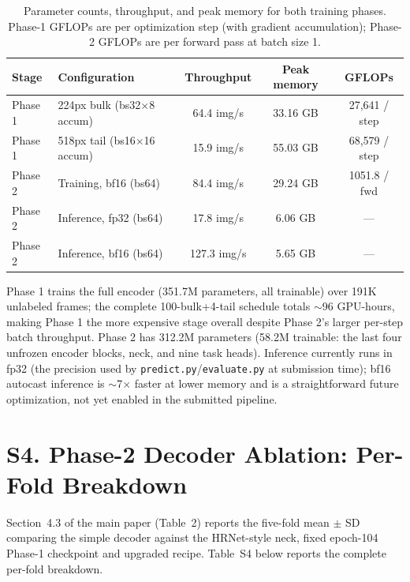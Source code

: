 \documentclass[runningheads]{llncs}
\begin{document}
\begin{table}[h]
\caption{Parameter counts, throughput, and peak memory for both training
phases. Phase-1 GFLOPs are per optimization step (with gradient
accumulation); Phase-2 GFLOPs are per forward pass at batch size 1.}
\label{tab:supp-compute}
\centering
\begin{tabular}{@{}llccc@{}}
\toprule
Stage & Configuration & Throughput & Peak memory & GFLOPs \\
\midrule
Phase 1 & 224px bulk (bs32$\times$8 accum) & 64.4 img/s & 33.16 GB & 27{,}641 / step \\
Phase 1 & 518px tail (bs16$\times$16 accum) & 15.9 img/s & 55.03 GB & 68{,}579 / step \\
Phase 2 & Training, bf16 (bs64) & 84.4 img/s & 29.24 GB & 1051.8 / fwd \\
Phase 2 & Inference, fp32 (bs64) & 17.8 img/s & 6.06 GB & --- \\
Phase 2 & Inference, bf16 (bs64) & 127.3 img/s & 5.65 GB & --- \\
\bottomrule
\end{tabular}
\end{table}

Phase 1 trains the full encoder (351.7M parameters, all trainable) over
191K unlabeled frames; the complete 100-bulk+4-tail schedule totals
$\sim$96 GPU-hours, making Phase 1 the more expensive stage overall despite
Phase 2's larger per-step batch throughput. Phase 2 has 312.2M parameters
(58.2M trainable: the last four unfrozen encoder blocks, neck, and nine task
heads). Inference currently runs in fp32 (the precision used by
\texttt{predict.py}/\texttt{evaluate.py} at submission time); bf16 autocast
inference is $\sim$7$\times$ faster at lower memory and is a straightforward
future optimization, not yet enabled in the submitted pipeline.

\section*{S4. Phase-2 Decoder Ablation: Per-Fold Breakdown}

Section~4.3 of the main paper (Table~2) reports the five-fold mean $\pm$ SD
comparing the simple decoder against the HRNet-style neck, fixed epoch-104
Phase-1 checkpoint and upgraded recipe. Table~S4 below reports the complete
per-fold breakdown.
\end{document}
